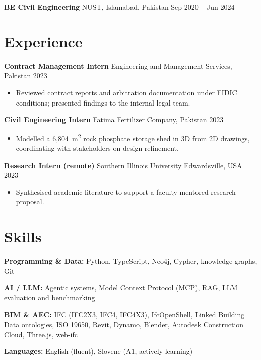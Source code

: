 \documentclass[a4paper,10.5pt]{article}
\newcommand{\datefill}{\dotfill}
\newcommand{\entry}[3]{\vspace{2.5pt}\noindent\textbf{#1} \textbar{} #2 \datefill{} #3\par\vspace{0.5pt}}
\newcommand{\skillrow}[2]{\noindent\textbf{#1:} #2\par\vspace{1pt}}
\begin{document}
\entry{BE Civil Engineering}{NUST, Islamabad, Pakistan}{Sep 2020 -- Jun 2024}

\section{Experience}
\entry{Contract Management Intern}{Engineering and Management Services, Pakistan}{2023}
\begin{itemize}
  \item Reviewed contract reports and arbitration documentation under FIDIC
        conditions; presented findings to the internal legal team.
\end{itemize}

\entry{Civil Engineering Intern}{Fatima Fertilizer Company, Pakistan}{2023}
\begin{itemize}
  \item Modelled a 6,804~m\textsuperscript{2} rock phosphate storage shed in 3D from
        2D drawings, coordinating with stakeholders on design refinement.
\end{itemize}

\entry{Research Intern (remote)}{Southern Illinois University Edwardsville, USA}{2023}
\begin{itemize}
  \item Synthesised academic literature to support a faculty-mentored research proposal.
\end{itemize}

\section{Skills}

\skillrow{Programming \& Data}{Python, TypeScript, Neo4j, Cypher, knowledge graphs, Git}
\skillrow{AI / LLM}{Agentic systems, Model Context Protocol (MCP), RAG, LLM evaluation and benchmarking}
\skillrow{BIM \& AEC}{IFC (IFC2X3, IFC4, IFC4X3), IfcOpenShell, Linked Building Data ontologies, ISO 19650, Revit, Dynamo, Blender, Autodesk Construction Cloud, Three.js, web-ifc}

\skillrow{Languages}{English (fluent), Slovene (A1, actively learning)}
\end{document}
